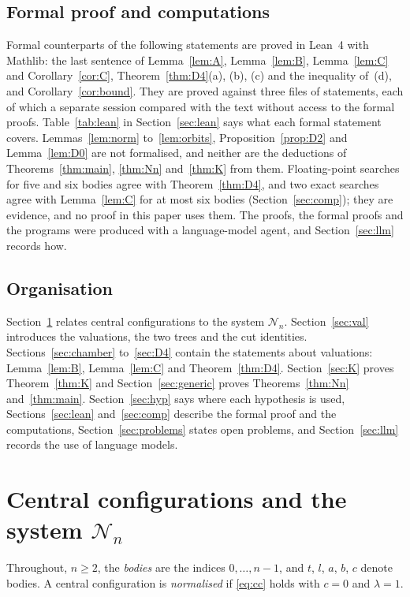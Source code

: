 \documentclass[11pt]{amsart}
\theoremstyle{definition}
\theoremstyle{remark}
\numberwithin{equation}{section}
\newcommand{\cN}{\mathcal{N}}
\begin{document}
\subsection*{Formal proof and computations} Formal counterparts of the following statements are proved
in Lean~4 with Mathlib: the last sentence of Lemma~\ref{lem:A}, Lemma~\ref{lem:B}, Lemma~\ref{lem:C} and
Corollary~\ref{cor:C}, Theorem~\ref{thm:D4}(a), (b), (c) and the inequality of~(d), and
Corollary~\ref{cor:bound}. They are proved against three files of statements, each of which a separate
session compared with the text without access to the formal proofs. Table~\ref{tab:lean} in
Section~\ref{sec:lean} says what each formal statement covers. Lemmas~\ref{lem:norm}
to~\ref{lem:orbits}, Proposition~\ref{prop:D2} and Lemma~\ref{lem:D0} are not formalised, and neither are
the deductions of Theorems~\ref{thm:main}, \ref{thm:Nn} and~\ref{thm:K} from them. Floating-point searches
for five and six bodies agree with Theorem~\ref{thm:D4}, and two exact searches agree with
Lemma~\ref{lem:C} for at most six bodies (Section~\ref{sec:comp}); they are evidence, and no proof in this
paper uses them. The proofs, the formal proofs and the programs were produced with a language-model agent,
and Section~\ref{sec:llm} records how.

\subsection*{Organisation} Section~\ref{sec:system} relates central configurations to the system
$\cN_n$. Section~\ref{sec:val} introduces the valuations, the two trees and the cut identities.
Sections~\ref{sec:chamber} to~\ref{sec:D4} contain the statements about valuations: Lemma~\ref{lem:B},
Lemma~\ref{lem:C} and Theorem~\ref{thm:D4}. Section~\ref{sec:K} proves Theorem~\ref{thm:K} and
Section~\ref{sec:generic} proves Theorems~\ref{thm:Nn} and~\ref{thm:main}. Section~\ref{sec:hyp} says
where each hypothesis is used, Sections~\ref{sec:lean} and~\ref{sec:comp} describe the formal proof and
the computations, Section~\ref{sec:problems} states open problems, and Section~\ref{sec:llm} records the
use of language models.

\section{Central configurations and the system \texorpdfstring{$\cN_n$}{N\_n}}\label{sec:system}

Throughout, $n \ge 2$, the \emph{bodies} are the indices $0, \dots, n-1$, and $t$, $l$, $a$, $b$, $c$
denote bodies. A central configuration is \emph{normalised} if \eqref{eq:cc} holds with $c = 0$ and
$\lambda = 1$.
\end{document}
